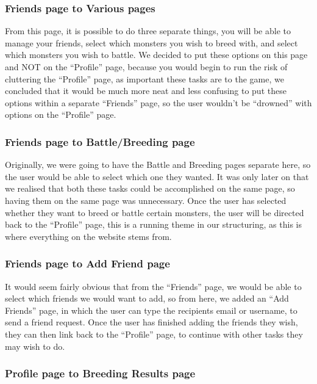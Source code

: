 \documentclass{project}
\begin{document}
\subsubsection{Friends page to Various pages}

From this page, it is possible to do three separate things, you will be able to manage your friends, select which monsters you wish to breed with, and select which monsters you wish to battle. We decided to put these options on this page and NOT on the “Profile” page, because you would begin to run the risk of cluttering the “Profile” page, as important these tasks are to the game, we concluded that it would be much more neat and less confusing to put these options within a separate “Friends” page, so the user wouldn’t be “drowned” with options on the “Profile” page.

\subsubsection{Friends page to Battle/Breeding page}

Originally, we were going to have the Battle and Breeding pages separate here, so the user would be able to select which one they wanted. It was only later on that we realised that both these tasks could be accomplished on the same page, so having them on the same page was unnecessary. Once the user has selected whether they want to breed or battle certain monsters, the user will be directed back to the “Profile” page, this is a running theme in our structuring, as this is where everything on the website stems from.

\subsubsection{Friends page to Add Friend page}

It would seem fairly obvious that from the “Friends” page, we would be able to select which friends we would want to add, so from here, we added an “Add Friends” page, in which the user can type the recipients email or username, to send a friend request. Once the user has finished adding the friends they wish, they can then link back to the “Profile” page, to continue with other tasks they may wish to do.

\subsubsection{Profile page to Breeding Results page}
\end{document}
